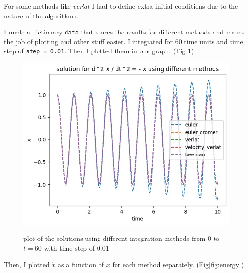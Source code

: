 \documentclass[12pt, a4paper]{article}
\begin{document}
	For some methods like \emph{verlat} I had to define extra initial conditions due to the nature of the algorithms.
	
	I made a dictionary \texttt{data} that stores the results for different methods and makes the job of plotting and other stuff easier.
	I integrated for 60 time units and time step of \texttt{step = 0.01}. Then I plotted them in one graph. (Fig \ref{fig:ODEs})
	\begin{figure}[h!]
		\centering
		\includegraphics[width=0.8\linewidth]{../p2/ode2_plots.jpg}
		\label{fig:ODEs}
		\caption{plot of the solutions using different integration methods from $0$ to $t = 60$ with time step of $0.01$}
	\end{figure}
	Then, I plotted $\dot{x}$ as a function of $x$ for each method separately. (Fig\ref{fig:energy})
\end{document}

